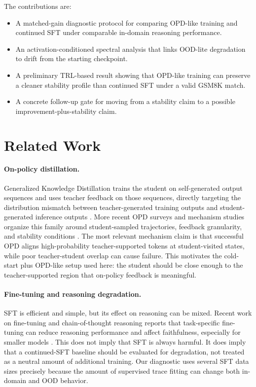 \documentclass[letterpaper]{article}
\begin{document}
The contributions are:
\begin{itemize}
    \item A matched-gain diagnostic protocol for comparing OPD-like training and continued SFT under comparable in-domain reasoning performance.
    \item An activation-conditioned spectral analysis that links OOD-lite degradation to drift from the starting checkpoint.
    \item A preliminary TRL-based result showing that OPD-like training can preserve a cleaner stability profile than continued SFT under a valid GSM8K match.
    \item A concrete follow-up gate for moving from a stability claim to a possible improvement-plus-stability claim.
\end{itemize}

\section{Related Work}

\paragraph{On-policy distillation.}
Generalized Knowledge Distillation trains the student on self-generated output sequences and uses teacher feedback on those sequences, directly targeting the distribution mismatch between teacher-generated training outputs and student-generated inference outputs \citep{agarwal2024gkd}.
More recent OPD surveys and mechanism studies organize this family around student-sampled trajectories, feedback granularity, and stability conditions \citep{song2026surveyopd,li2026rethinkingopd}.
The most relevant mechanism claim is that successful OPD aligns high-probability teacher-supported tokens at student-visited states, while poor teacher-student overlap can cause failure.
This motivates the cold-start plus OPD-like setup used here: the student should be close enough to the teacher-supported region that on-policy feedback is meaningful.

\paragraph{Fine-tuning and reasoning degradation.}
SFT is efficient and simple, but its effect on reasoning can be mixed.
Recent work on fine-tuning and chain-of-thought reasoning reports that task-specific fine-tuning can reduce reasoning performance and affect faithfulness, especially for smaller models \citep{lobo2025finetuningcot}.
This does not imply that SFT is always harmful.
It does imply that a continued-SFT baseline should be evaluated for degradation, not treated as a neutral amount of additional training.
Our diagnostic uses several SFT data sizes precisely because the amount of supervised trace fitting can change both in-domain and OOD behavior.
\end{document}

